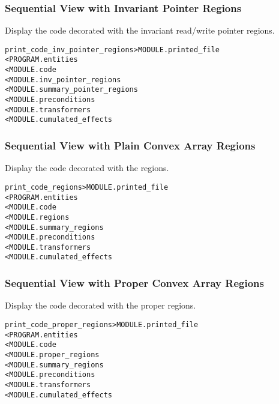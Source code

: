 \documentclass[a4paper]{report}
\newenvironment{PipsMake}{\begin{alltt}}{\end{alltt}}
\newenvironment{PipsPass}[1]{\label{pass:#1}}{}
\begin{document}
\subsubsection{Sequential View with Invariant Pointer Regions}

\begin{PipsPass}{print_code_inv_pointer_regions}
Display the code decorated with the invariant read/write pointer regions.
\end{PipsPass}

\begin{PipsMake}
print_code_inv_pointer_regions              > MODULE.printed_file
        < PROGRAM.entities
        < MODULE.code
        < MODULE.inv_pointer_regions
        < MODULE.summary_pointer_regions
        < MODULE.preconditions
        < MODULE.transformers
        < MODULE.cumulated_effects
\end{PipsMake}


\subsubsection{Sequential View with Plain Convex Array Regions}
\label{sec:plain-regions}

\begin{PipsPass}{print_code_regions}
Display the code decorated with the regions.
\end{PipsPass}

\begin{PipsMake}
print_code_regions              > MODULE.printed_file
        < PROGRAM.entities
        < MODULE.code
        < MODULE.regions
        < MODULE.summary_regions
        < MODULE.preconditions
        < MODULE.transformers
        < MODULE.cumulated_effects
\end{PipsMake}

\subsubsection{Sequential View with Proper Convex Array Regions}

\begin{PipsPass}{print_code_proper_regions}
Display the code decorated with the proper regions.
\end{PipsPass}

\begin{PipsMake}
print_code_proper_regions              > MODULE.printed_file
        < PROGRAM.entities
        < MODULE.code
        < MODULE.proper_regions
        < MODULE.summary_regions
        < MODULE.preconditions
        < MODULE.transformers
        < MODULE.cumulated_effects
\end{PipsMake}
\end{document}

